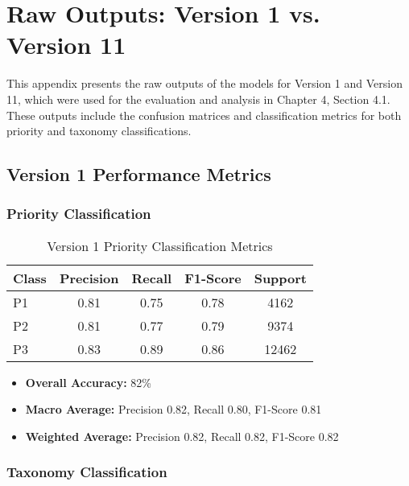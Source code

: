 \chapter{Raw Outputs: Version 1 vs. Version 11}
\label{AppendixA}

This appendix presents the raw outputs of the models for Version 1 and Version 11, which were used for the evaluation and analysis in Chapter 4, Section 4.1. These outputs include the confusion matrices and classification metrics for both priority and taxonomy classifications.

\section*{Version 1 Performance Metrics}

\subsection*{Priority Classification}

\begin{table}[h!]
    \centering
    \caption{Version 1 Priority Classification Metrics}
    \label{tab:v1_priority_metrics}
    \begin{tabular}{|l|c|c|c|c|}
    \hline
    \textbf{Class} & \textbf{Precision} & \textbf{Recall} & \textbf{F1-Score} & \textbf{Support} \\
    \hline
    P1 & 0.81 & 0.75 & 0.78 & 4162 \\
    \hline
    P2 & 0.81 & 0.77 & 0.79 & 9374\\
    \hline
    P3 & 0.83 & 0.89 & 0.86 & 12462 \\
    \hline
    \end{tabular}
\end{table}

\begin{itemize}
    \item \textbf{Overall Accuracy:} 82\%
    \item \textbf{Macro Average:} Precision 0.82, Recall 0.80, F1-Score 0.81
    \item \textbf{Weighted Average:} Precision 0.82, Recall 0.82, F1-Score 0.82
\end{itemize}

\subsection*{Taxonomy Classification}

